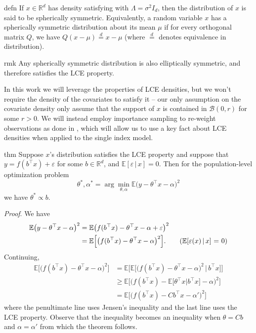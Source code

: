 \documentclass[11pt]{article}
\begin{document}
\begin{restatable}{defn}{}\label{def: spherical symmetry}
If $x\in \mathbb{R}^d$ has density satisfying  with $\Lambda = \sigma^2I_d$, then the distribution of $x$ is said to be spherically symmetric. Equivalently, a random variable $x$ has a spherically symmetric distribution about its mean $\mu$ if for every orthogonal matrix $Q$, we have $Q(x - \mu) \overset{d}{=} x - \mu$ (where $\overset{d}{=}$ denotes equivalence in distribution). 
\end{restatable}


\begin{restatable}{rmk}{}
    Any spherically symmetric distribution is also elliptically symmetric, and therefore satisfies the LCE property. 
\end{restatable}

In this work we will leverage the properties of LCE densities, but we won't require the density of the covariates to satisfy it -- our only assumption on the covariate density only assume that the support of $x$ is contained in $\mathcal{B}(0, r)$ for some $r > 0$. We will instead employ importance sampling to re-weight observations as done in \citet{Newey_Ruud_2005}, which will allow us to use a key fact about LCE densities when applied to the single index model.

\begin{restatable}{thm}{} \label{thm: lce single index}
    Suppose $x$'s distribution satisfies the LCE property and suppose that $y = f(b^{\top}x) + \varepsilon$ for some $b \in \mathbb{R}^d$, and $\mathbb{E}[\varepsilon \,| \, x] = 0$. Then for the population-level optimization problem 
    \[\theta^*, \alpha^* = \arg\min_{\theta, \alpha}\mathbb{E}\big(y - \theta^{\top}x - \alpha\big)^2 \]
    we have $\theta^* \propto b$. 
\end{restatable}
\noindent \textit{Proof}. We have 
\begin{align*}
    \mathbb{E}\big(y - \theta^{\top}x-\alpha\big)^2 &= \mathbb{E}\big(f(b^{\top}x) - \theta^{\top}x-\alpha  + \varepsilon\big)^2\\
    &= \mathbb{E}\Big[\big(f(b^{\top}x) - \theta^{\top}x-\alpha\big)^2\Big]. \tag{$\mathbb{E}[\varepsilon(x)\,|\,x]$ = 0}
\end{align*}
Continuing, 
\begin{align*}
    \mathbb{E}\Big[\big(f(b^{\top}x) - \theta^{\top}x-\alpha\big)^2\Big]&= \mathbb{E}\Big[ \mathbb{E}\Big[\big(f(b^{\top}x) - \theta^{\top}x-\alpha\big)^2 \, \Big | \, b^{\top}x\Big] \Big] \\
    &\geq \mathbb{E}\Big[ \Big(f(b^{\top}x) - \mathbb{E}\big[\theta^{\top}x |b^{\top}x\big]-\alpha\Big)^2 \Big] \\
    &= \mathbb{E}\Big[ \Big(f(b^{\top}x) - Cb^{\top}x-\alpha'\Big)^2 \Big]
\end{align*}
where the penultimate line uses Jensen's inequality and the last line uses the LCE property. Observe that the inequality becomes an inequality when $\theta = Cb$ and $\alpha = \alpha'$ from which the theorem follows. 
\end{document}
